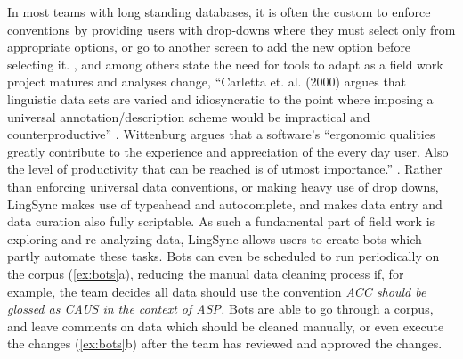 \documentclass[letterpaper, 12pt, dvips]{mitwpl}
\begin{document}
In most teams with long standing databases,
it is often the custom to enforce conventions by providing users with drop-downs where they must select only from appropriate options,
or go to another screen to add the new option before selecting it.
\cite{Palmer:2009}, \cite{Cihlar:2008}  and \cite{Wittenburg:2006} among others state the need for tools to adapt as a field work project matures and analyses change, 
``Carletta et. al. (2000) argues that linguistic data sets are varied and idiosyncratic to the point where imposing a universal annotation/description scheme would be impractical and counterproductive''   \cite[p.11]{Cihlar:2008}. Wittenburg argues that a software's ``ergonomic qualities greatly contribute to the experience and appreciation of the every day user. Also the level of productivity that can be reached is of utmost importance.'' \citep[p.1559]{Wittenburg:2006}.
Rather than enforcing universal data conventions,
or making heavy use of drop downs, 
LingSync makes use of  typeahead and autocomplete, 
and makes data entry and data curation also fully scriptable.
As such a fundamental part of field work is exploring and re-analyzing data,
LingSync allows users to create bots which partly automate these tasks.
Bots can even be scheduled to run periodically on the corpus (\ref{ex:bots}a),
reducing the manual data cleaning process if,
for example,
the team decides all data should use the convention \emph{ACC should be glossed as CAUS in the context of ASP.} Bots are able to go through a corpus,
and leave comments on data which should be cleaned manually,
or even execute the changes (\ref{ex:bots}b) after the team has reviewed and approved the changes.


\end{document}
